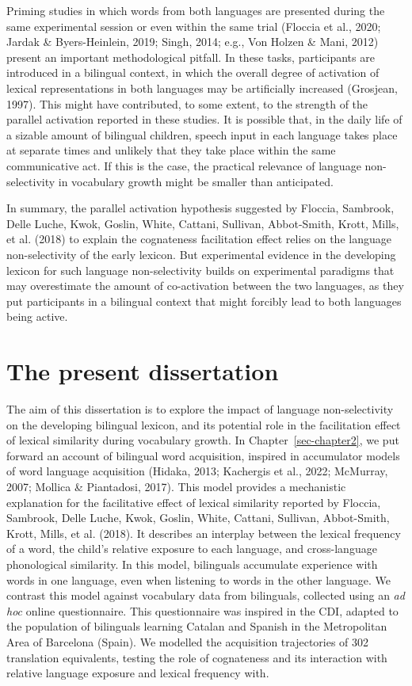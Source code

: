 \documentclass[
  12pt,
  b5paperpaper,
  twoside]{scrreprt}
\begin{document}
Priming studies in which words from both languages are presented during
the same experimental session or even within the same trial (Floccia et
al., 2020; Jardak \& Byers-Heinlein, 2019; Singh, 2014; e.g., Von Holzen
\& Mani, 2012) present an important methodological pitfall. In these
tasks, participants are introduced in a bilingual context, in which the
overall degree of activation of lexical representations in both
languages may be artificially increased (Grosjean, 1997). This might
have contributed, to some extent, to the strength of the parallel
activation reported in these studies. It is possible that, in the daily
life of a sizable amount of bilingual children, speech input in each
language takes place at separate times and unlikely that they take place
within the same communicative act. If this is the case, the practical
relevance of language non-selectivity in vocabulary growth might be
smaller than anticipated.

In summary, the parallel activation hypothesis suggested by Floccia,
Sambrook, Delle Luche, Kwok, Goslin, White, Cattani, Sullivan,
Abbot-Smith, Krott, Mills, et al. (2018) to explain the cognateness
facilitation effect relies on the language non-selectivity of the early
lexicon. But experimental evidence in the developing lexicon for such
language non-selectivity builds on experimental paradigms that may
overestimate the amount of co-activation between the two languages, as
they put participants in a bilingual context that might forcibly lead to
both languages being active.

\hypertarget{the-present-dissertation}{%
\section{The present dissertation}\label{the-present-dissertation}}

The aim of this dissertation is to explore the impact of language
non-selectivity on the developing bilingual lexicon, and its potential
role in the facilitation effect of lexical similarity during vocabulary
growth. In Chapter~\ref{sec-chapter2}, we put forward an account of
bilingual word acquisition, inspired in accumulator models of word
language acquisition (Hidaka, 2013; Kachergis et al., 2022; McMurray,
2007; Mollica \& Piantadosi, 2017). This model provides a mechanistic
explanation for the facilitative effect of lexical similarity reported
by Floccia, Sambrook, Delle Luche, Kwok, Goslin, White, Cattani,
Sullivan, Abbot-Smith, Krott, Mills, et al. (2018). It describes an
interplay between the lexical frequency of a word, the child's relative
exposure to each language, and cross-language phonological similarity.
In this model, bilinguals accumulate experience with words in one
language, even when listening to words in the other language. We
contrast this model against vocabulary data from bilinguals, collected
using an \emph{ad hoc} online questionnaire. This questionnaire was
inspired in the CDI, adapted to the population of bilinguals learning
Catalan and Spanish in the Metropolitan Area of Barcelona (Spain). We
modelled the acquisition trajectories of 302 translation equivalents,
testing the role of cognateness and its interaction with relative
language exposure and lexical frequency with.
\end{document}
